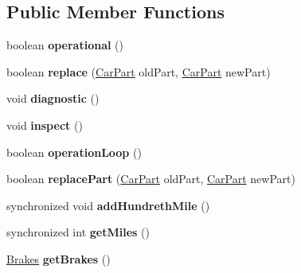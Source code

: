 \subsection*{Public Member Functions}
\begin{DoxyCompactItemize}
\item 
\hypertarget{classCars_1_1Car_a234016f160ede7f71195720b6c91e660}{}boolean {\bfseries operational} ()\label{classCars_1_1Car_a234016f160ede7f71195720b6c91e660}

\item 
\hypertarget{classCars_1_1Car_aa62627c0bbdcccbb1e09cbd355418804}{}boolean {\bfseries replace} (\hyperlink{classCars_1_1CarPart}{Car\+Part} old\+Part, \hyperlink{classCars_1_1CarPart}{Car\+Part} new\+Part)\label{classCars_1_1Car_aa62627c0bbdcccbb1e09cbd355418804}

\item 
\hypertarget{classCars_1_1Car_acd98adbaa2fa0b328be9ee18e204e671}{}void {\bfseries diagnostic} ()\label{classCars_1_1Car_acd98adbaa2fa0b328be9ee18e204e671}

\item 
\hypertarget{classCars_1_1Car_a06a454f3de50b5681ed1b0b8c29b8b14}{}void {\bfseries inspect} ()\label{classCars_1_1Car_a06a454f3de50b5681ed1b0b8c29b8b14}

\item 
\hypertarget{classCars_1_1Car_a6236a57ea2bfa16888f916d1fe34919f}{}boolean {\bfseries operation\+Loop} ()\label{classCars_1_1Car_a6236a57ea2bfa16888f916d1fe34919f}

\item 
\hypertarget{classCars_1_1Car_ab70985dbffac9c217ec6c7909d7d15af}{}boolean {\bfseries replace\+Part} (\hyperlink{classCars_1_1CarPart}{Car\+Part} old\+Part, \hyperlink{classCars_1_1CarPart}{Car\+Part} new\+Part)\label{classCars_1_1Car_ab70985dbffac9c217ec6c7909d7d15af}

\item 
\hypertarget{classCars_1_1Car_a7ad19523263277304b44f8b0f650ae73}{}synchronized void {\bfseries add\+Hundreth\+Mile} ()\label{classCars_1_1Car_a7ad19523263277304b44f8b0f650ae73}

\item 
\hypertarget{classCars_1_1Car_a7bf8ab93d4c9e2bd7dbf9ce24dedae24}{}synchronized int {\bfseries get\+Miles} ()\label{classCars_1_1Car_a7bf8ab93d4c9e2bd7dbf9ce24dedae24}

\item 
\hypertarget{classCars_1_1Car_a09079918be69fcad4da0bf9c02331bad}{}\hyperlink{classSystems_1_1Brakes}{Brakes} {\bfseries get\+Brakes} ()\label{classCars_1_1Car_a09079918be69fcad4da0bf9c02331bad}


\end{DoxyCompactItemize}

